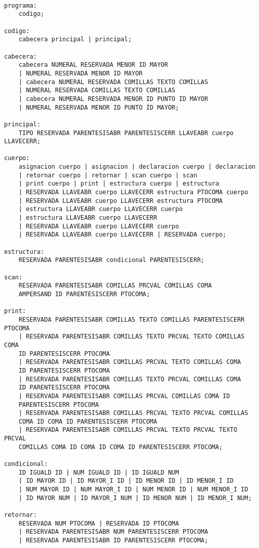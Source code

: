 \documentclass[aspectratio=169]{article}
\begin{document}
\begin{lstlisting}

programa:
	codigo;

codigo:
	cabecera principal | principal;

cabecera:
	cabecera NUMERAL RESERVADA MENOR ID MAYOR
	| NUMERAL RESERVADA MENOR ID MAYOR
	| cabecera NUMERAL RESERVADA COMILLAS TEXTO COMILLAS
	| NUMERAL RESERVADA COMILLAS TEXTO COMILLAS
	| cabecera NUMERAL RESERVADA MENOR ID PUNTO ID MAYOR
	| NUMERAL RESERVADA MENOR ID PUNTO ID MAYOR;

principal:
	TIPO RESERVADA PARENTESISABR PARENTESISCERR LLAVEABR cuerpo LLAVECERR;

cuerpo:
	asignacion cuerpo | asignacion | declaracion cuerpo | declaracion
	| retornar cuerpo | retornar | scan cuerpo | scan
	| print cuerpo | print | estructura cuerpo | estructura
	| RESERVADA LLAVEABR cuerpo LLAVECERR estructura PTOCOMA cuerpo
	| RESERVADA LLAVEABR cuerpo LLAVECERR estructura PTOCOMA
	| estructura LLAVEABR cuerpo LLAVECERR cuerpo
	| estructura LLAVEABR cuerpo LLAVECERR
	| RESERVADA LLAVEABR cuerpo LLAVECERR cuerpo
	| RESERVADA LLAVEABR cuerpo LLAVECERR | RESERVADA cuerpo;

estructura:
	RESERVADA PARENTESISABR condicional PARENTESISCERR;

scan:
	RESERVADA PARENTESISABR COMILLAS PRCVAL COMILLAS COMA
	AMPERSAND ID PARENTESISCERR PTOCOMA;

print:
	RESERVADA PARENTESISABR COMILLAS TEXTO COMILLAS PARENTESISCERR PTOCOMA
	| RESERVADA PARENTESISABR COMILLAS TEXTO PRCVAL TEXTO COMILLAS COMA
	ID PARENTESISCERR PTOCOMA
	| RESERVADA PARENTESISABR COMILLAS PRCVAL TEXTO COMILLAS COMA
	ID PARENTESISCERR PTOCOMA
	| RESERVADA PARENTESISABR COMILLAS TEXTO PRCVAL COMILLAS COMA
	ID PARENTESISCERR PTOCOMA
	| RESERVADA PARENTESISABR COMILLAS PRCVAL COMILLAS COMA ID
	PARENTESISCERR PTOCOMA
	| RESERVADA PARENTESISABR COMILLAS PRCVAL TEXTO PRCVAL COMILLAS
	COMA ID COMA ID PARENTESISCERR PTOCOMA
	| RESERVADA PARENTESISABR COMILLAS PRCVAL TEXTO PRCVAL TEXTO PRCVAL
	COMILLAS COMA ID COMA ID COMA ID PARENTESISCERR PTOCOMA;

condicional:
	ID IGUALD ID | NUM IGUALD ID | ID IGUALD NUM
	| ID MAYOR ID | ID MAYOR_I ID | ID MENOR ID | ID MENOR_I ID
	| NUM MAYOR ID | NUM MAYOR_I ID | NUM MENOR ID | NUM MENOR_I ID
	| ID MAYOR NUM | ID MAYOR_I NUM | ID MENOR NUM | ID MENOR_I NUM;

retornar:
	RESERVADA NUM PTOCOMA | RESERVADA ID PTOCOMA
	| RESERVADA PARENTESISABR NUM PARENTESISCERR PTOCOMA
	| RESERVADA PARENTESISABR ID PARENTESISCERR PTOCOMA;



\end{lstlisting}
\end{document}
